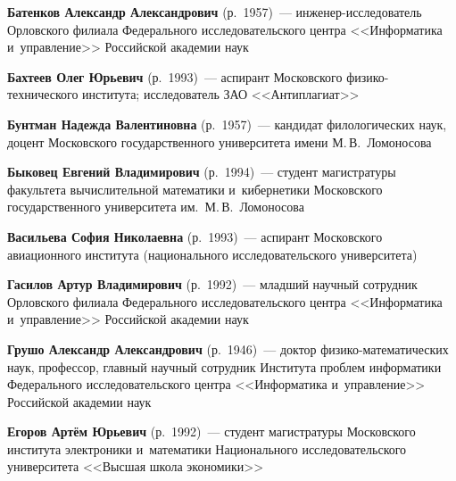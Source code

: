\begin{multicols}{2}

\noindent
\textbf{Батенков Александр Александрович} (р.\ 1957)~--- 
ин\-же\-нер-ис\-сле\-до\-ва\-тель Орловского филиала Федерального исследовательского 
цент\-ра <<Информатика и~управ\-ле\-ние>> Российской академии наук

\vspace*{3pt}

\noindent
\textbf{Бахтеев Олег Юрьевич} (р.\ 1993)~--- аспирант Московского 
фи\-зи\-ко-тех\-ни\-че\-ско\-го института; исследователь ЗАО <<Антиплагиат>>

\vspace*{3pt}



\noindent
\textbf{Бунтман Надежда Валентиновна} (р.\ 1957)~--- 
кандидат филологических наук, доцент Московского 
государственного университета имени М.\,В.~Ломоносова

\vspace*{3pt}

\noindent
\textbf{Быковец Евгений Владимирович} (р.\ 1994)~--- 
студент магистратуры факультета вычислительной математики и~кибернетики 
Московского государственного университета им.\ М.\,В.~Ломоносова

\vspace*{3pt}

\noindent
\textbf{Васильева София Николаевна} (р.\ 1993)~--- 
аспирант Московского авиационного института (национального исследовательского 
университета)

\vspace*{3pt}

\noindent
\textbf{Гасилов Артур Владимирович} (р.\ 1992)~--- 
младший научный сотрудник Орловского филиала Федерального исследовательского цент\-ра 
<<Информатика и~управ\-ле\-ние>> Российской академии наук

\vspace*{3pt}

\noindent
\textbf{Грушо Александр Александрович} (р.\ 1946)~--- 
доктор фи\-зи\-ко-ма\-те\-ма\-ти\-че\-ских наук, профессор,
главный научный со\-труд\-ник %
Института проб\-лем информатики Федерального исследовательского центра 
<<Информатика и~управ\-ле\-ние>> Российской академии наук

\vspace*{3pt}

\noindent
\textbf{Егоров Артём Юрьевич} (р.\ 1992)~---  
студент магистратуры Московского института электроники и~математики
Национального исследовательского университета 
<<Высшая школа экономики>>


\end{multicols}
